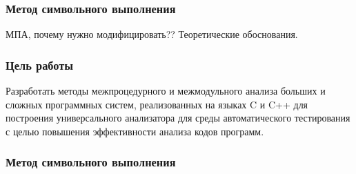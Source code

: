 \documentclass[hyperref={pdfpagelabels=false}]{beamer}
\begin{document}
\begin{frame}
\frametitle{Метод символьного выполнения}
МПА, почему нужно модифицировать??
Теоретические обоснования.
\end{frame}

\begin{frame}
\frametitle{Цель работы}
Разработать методы межпроцедурного и межмодульного анализа больших и сложных программных систем, реализованных на языках C и C++ для построения универсального анализатора для среды автоматического тестирования с целью повышения эффективности анализа кодов программ.
\end{frame}


\begin{frame}
\frametitle{Метод символьного выполнения}
\begin{figure}[h]
\end{figure}
\end{frame}
\end{document}
